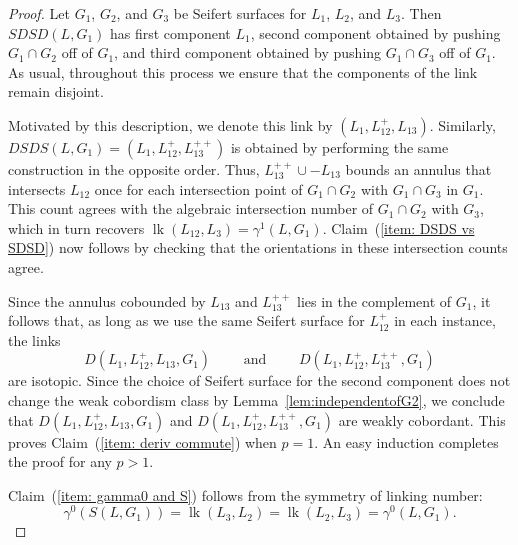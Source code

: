 \documentclass[a4paper, 11pt]{amsart}
\newcommand{\red}{\textcolor{red}}
\newcommand{\chris}[1]{\red{[Chris] #1}}
\theoremstyle{definition}
\newcommand{\lk}{\operatorname{lk}}
\newcommand{\Swap}{S}%
\newcommand{\pref}[1]{(\ref{#1})}
\begin{document}

\begin{proof}
Let $G_1$, $G_2$, and $G_3$ be Seifert surfaces for $L_1$, $L_2$, and $L_3$.
Then $\Swap D\Swap D(L,G_1)$ has first component $L_1$, second component obtained by pushing $G_1\cap G_2$ off of $G_1$, and third component obtained by pushing $G_1\cap G_3$ off of $G_1$. As usual, throughout this process we ensure that the components of the link remain disjoint.

Motivated by this description, we denote this link by $(L_1, L_{12}^{+}, L_{13})$. Similarly, $D\Swap D\Swap(L,G_1)=(L_1, L_{12}^{+}, L_{13}^{++})$ is obtained by performing the same construction in the opposite order. Thus, $L_{13}^{++}\cup-L_{13}$ bounds an annulus that intersects $L_{12}$ once for each intersection point of $G_1\cap G_2$ with $G_1\cap G_3$ in $G_1$. This count agrees with the algebraic intersection number of $G_1\cap G_2$ with $G_3$, which in turn recovers $\lk(L_{12},L_3)=\gamma^1(L,G_1)$. Claim~\pref{item: DSDS vs SDSD} now follows by checking that the orientations in these intersection counts agree.

Since the annulus cobounded by $L_{13}$ and $L_{13}^{++}$ lies in the complement of $G_1$, it follows that, as long as we use the same Seifert surface for $L_{12}^+$ in each instance, the links
\[
D(L_1, L_{12}^+, L_{13}, G_1)
\qquad\text{ and }\qquad
D(L_1, L_{12}^+, L_{13}^{++}, G_1)
\]
are isotopic. Since the choice of Seifert surface for the second component does not change the weak cobordism class by Lemma~\ref{lem:independentofG2}, we conclude that $D(L_1, L_{12}^+, L_{13}, G_1)$ and $D(L_1, L_{12}^+, L_{13}^{++}, G_1)$ are weakly cobordant. This proves Claim~\pref{item: deriv commute} when $p=1$. An easy induction completes the proof for any $p>1$.

Claim~\pref{item: gamma0 and S} follows from the symmetry of linking number:
\[
\gamma^0(\Swap(L,G_1))=\lk(L_3,L_2)=\lk(L_2,L_3)=\gamma^0(L,G_1).
\]


\end{proof}
\end{document}
